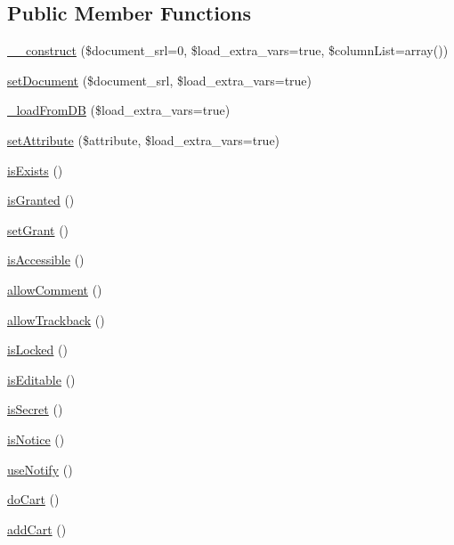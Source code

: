 \subsection*{Public Member Functions}
\begin{DoxyCompactItemize}
\item 
\hyperlink{classdocumentItem_a57af37f65e076db8d12ce75158e99c97}{\-\_\-\-\_\-construct} (\$document\-\_\-srl=0, \$load\-\_\-extra\-\_\-vars=true, \$column\-List=array())
\item 
\hyperlink{classdocumentItem_a2ea6b3cbf877ed27bc0f0ab935d35e97}{set\-Document} (\$document\-\_\-srl, \$load\-\_\-extra\-\_\-vars=true)
\item 
\hyperlink{classdocumentItem_a277e26ba6e0abb42dab5cccbdf48e450}{\-\_\-load\-From\-D\-B} (\$load\-\_\-extra\-\_\-vars=true)
\item 
\hyperlink{classdocumentItem_a456494e6f2ba42f247a1dec402b3ff3a}{set\-Attribute} (\$attribute, \$load\-\_\-extra\-\_\-vars=true)
\item 
\hyperlink{classdocumentItem_a91139891022f05e19b2f685ed25e000b}{is\-Exists} ()
\item 
\hyperlink{classdocumentItem_a571c72e54e18c33bb93303489edda406}{is\-Granted} ()
\item 
\hyperlink{classdocumentItem_a4a60e218cd41d2e23cf72bb720cf1cd8}{set\-Grant} ()
\item 
\hyperlink{classdocumentItem_a560fb40cd322ef5b8b3aa7d298730fcd}{is\-Accessible} ()
\item 
\hyperlink{classdocumentItem_a6d266a19a4703f5282b030d27e7e525a}{allow\-Comment} ()
\item 
\hyperlink{classdocumentItem_a701624de548b08fd26b129bba0acbf3d}{allow\-Trackback} ()
\item 
\hyperlink{classdocumentItem_ad99f7615ed11289ce2976096d36d5185}{is\-Locked} ()
\item 
\hyperlink{classdocumentItem_afb7ed54e828eeae6607328e285c7a8fe}{is\-Editable} ()
\item 
\hyperlink{classdocumentItem_ae827d800e8fac709b217072f1580f8e4}{is\-Secret} ()
\item 
\hyperlink{classdocumentItem_a30a4b6ad6555ec8c83be2bbb01b29361}{is\-Notice} ()
\item 
\hyperlink{classdocumentItem_a25c9be892a37dbb3d519b980cd10930a}{use\-Notify} ()
\item 
\hyperlink{classdocumentItem_abac6ff72ec8faf238215dedb1df85569}{do\-Cart} ()
\item 
\hyperlink{classdocumentItem_af32d9aba9797f3a913ac66031304ee92}{add\-Cart} ()

\end{DoxyCompactItemize}
